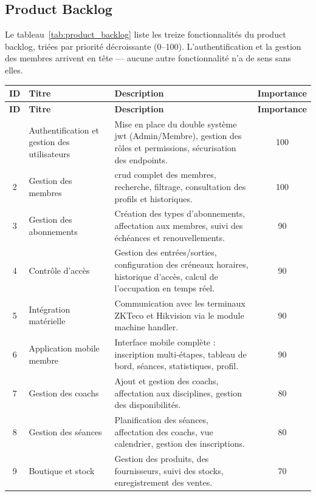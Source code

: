 \documentclass[../main.tex]{subfiles}
\begin{document}
\subsection{Product Backlog}
Le tableau~\ref{tab:product_backlog} liste les treize fonctionnalit\'{e}s du product backlog, tri\'{e}es par priorit\'{e} d\'{e}croissante (0--100). L'authentification et la gestion des membres arrivent en t\^{e}te --- aucune autre fonctionnalit\'{e} n'a de sens sans elles.

\begin{longtable}{|c|p{4.5cm}|p{6.5cm}|c|}
\hline
\textbf{ID} & \textbf{Titre} & \textbf{Description} & \textbf{Importance} \\
\hline
\endfirsthead
\hline
\textbf{ID} & \textbf{Titre} & \textbf{Description} & \textbf{Importance} \\
\hline
\endhead
\hline
\endfoot
1 & Authentification et gestion des utilisateurs & Mise en place du double syst\`{e}me \acrshort{jwt} (Admin/Membre), gestion des r\^{o}les et permissions, s\'{e}curisation des endpoints. & 100 \\
\hline
2 & Gestion des membres & \acrshort{crud} complet des membres, recherche, filtrage, consultation des profils et historiques. & 100 \\
\hline
3 & Gestion des abonnements & Cr\'{e}ation des types d'abonnements, affectation aux membres, suivi des \'{e}ch\'{e}ances et renouvellements. & 90 \\
\hline
4 & Contr\^{o}le d'acc\`{e}s & Gestion des entr\'{e}es/sorties, configuration des cr\'{e}neaux horaires, historique d'acc\`{e}s, calcul de l'occupation en temps r\'{e}el. & 90 \\
\hline
5 & Int\'{e}gration mat\'{e}rielle & Communication avec les terminaux ZKTeco et Hikvision via le module machine handler. & 90 \\
\hline
6 & Application mobile membre & Interface mobile compl\`{e}te : inscription multi-\'{e}tapes, tableau de bord, s\'{e}ances, statistiques, profil. & 90 \\
\hline
7 & Gestion des coachs & Ajout et gestion des coachs, affectation aux disciplines, gestion des disponibilit\'{e}s. & 80 \\
\hline
8 & Gestion des s\'{e}ances & Planification des s\'{e}ances, affectation des coachs, vue calendrier, gestion des inscriptions. & 80 \\
\hline
9 & Boutique et stock & Gestion des produits, des fournisseurs, suivi des stocks, enregistrement des ventes. & 70 \\

\end{longtable}
\end{document}
